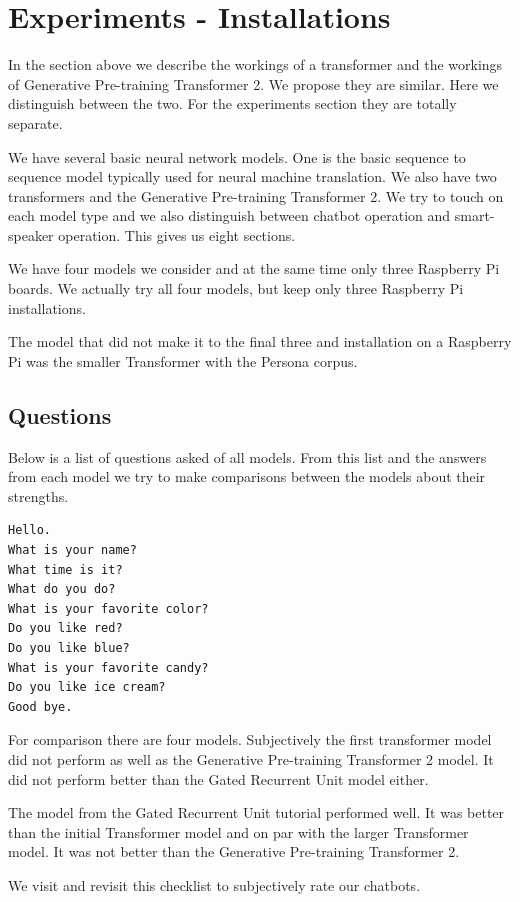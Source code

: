 

\section{Experiments - Installations}
In the section above we describe the workings of a transformer and the workings of Generative Pre-training Transformer 2. We propose they are similar. Here we distinguish between the two. For the experiments section they are totally separate.

We have several basic neural network models. One is the basic sequence to sequence model typically used for neural machine translation. We also have two transformers and the Generative Pre-training Transformer 2. We try to touch on each model type and we also distinguish between chatbot operation and smart-speaker operation. This gives us eight sections. 

We have four models we consider and at the same time only three Raspberry Pi boards. We actually try all four models, but keep only three Raspberry Pi installations. 

The model that did not make it to the final three and installation on a Raspberry Pi was the smaller Transformer with the Persona corpus.

\subsection{Questions}
Below is a list of questions asked of all models. From this list and the answers from each model we try to make comparisons between the models about their strengths.

\begin{verbatim}
Hello.
What is your name? 
What time is it?
What do you do?
What is your favorite color?
Do you like red?
Do you like blue?
What is your favorite candy?
Do you like ice cream?
Good bye.
\end{verbatim}

For comparison there are four models. Subjectively the first transformer model did not perform as well as the Generative Pre-training Transformer 2 model. It did not perform better than the Gated Recurrent Unit model either. 

The model from the Gated Recurrent Unit tutorial performed well. It was better than the initial Transformer model and on par with the larger Transformer model. It was not better than the Generative Pre-training Transformer 2.

We visit and revisit this checklist to subjectively rate our chatbots.

